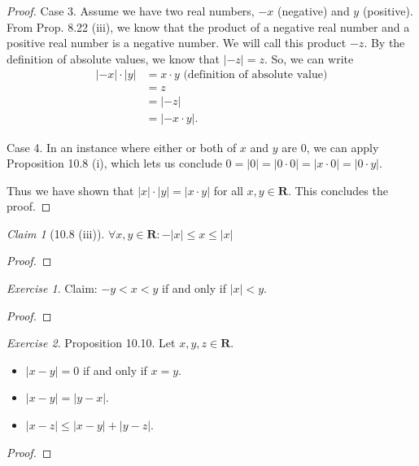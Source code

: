 \documentclass[12pt,oneside]{amsart}
\theoremstyle{remark}
\newtheorem{exer}{Exercise}
\newtheorem{claim}{Claim}[exer]
\newcommand{\bfR}{\mathbf{R}}
\begin{document}
\begin{proof}
Case 3. Assume we have two real numbers, $-x$ (negative) and $y$ (positive). From Prop. 8.22 (iii), we know that the product of a negative real number and a positive real number is a negative number. We will call this product $-z$. By the definition of absolute values, we know that $|-z| = z$. So, we can write
\begin{equation}
\begin{split}
|-x| \cdot |y| &= x \cdot y \text{ (definition of absolute value)} \\
               &= z \\
               &= |-z| \\
               &= |-x \cdot y|.
\end{split}
\end{equation}

Case 4. In an instance where either or both of $x$ and $y$ are 0, we can apply Proposition 10.8 (i), which lets us conclude $0 = |0| = |0 \cdot 0| = |x \cdot 0| = |0 \cdot y|$.

Thus we have shown that $|x| \cdot |y| = |x \cdot y|$ for all $x, y \in \bfR$. This concludes the proof.
\end{proof}

\begin{claim}[10.8 (iii)]
$\forall x, y \in \bfR: -|x| \leq x \leq |x|$
\end{claim}
\begin{proof}
\end{proof}

\newpage
\begin{exer}
Claim: $-y < x < y$ if and only if $|x| < y$.
\end{exer}
\begin{proof}
\end{proof}

\newpage
\begin{exer}
Proposition 10.10. Let $x, y, z \in \bfR$.
\begin{itemize}
  \item[ (i) ] $|x - y| = 0$ if and only if $x = y$.
  \item[ (ii) ] $|x - y| = |y - x|$.
  \item[ (iii) ] $|x - z| \leq |x - y| + |y - z|$.
\end{itemize}
\end{exer}
\begin{proof}
\end{proof}
\end{document}
